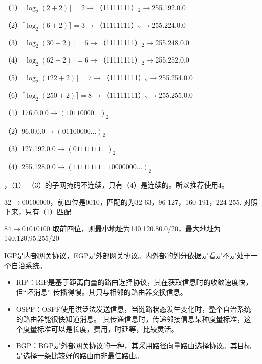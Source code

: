 \documentclass{ctexart}
\begin{document}
    （1）$\lceil\log_2(2+2) \rceil=2$$\rightarrow$（11111111）$_2\rightarrow$255.192.0.0

    （2）$\lceil\log_2(6+2) \rceil=3$$\rightarrow$（11111111）$_2\rightarrow$255.224.0.0

    （3）$\lceil\log_2(30+2) \rceil=5$$\rightarrow$（11111111）$_2\rightarrow$255.248.0.0

    （4）$\lceil\log_2(62+2) \rceil=6$$\rightarrow$（11111111）$_2\rightarrow$255.252.0.0

    （5）$\lceil\log_2(122+2) \rceil=7$$\rightarrow$（11111111）$_2\rightarrow$255.254.0.0

    （6）$\lceil\log_2(250+2) \rceil=8$$\rightarrow$（11111111）$_2\rightarrow$255.255.0.0


    \answer[4-25]
    （1）176.0.0.0$\rightarrow (10110000...)_2$

    \quad（2）96.0.0.0$\rightarrow (01100000...)_2$

    \quad（3）127.192.0.0$\rightarrow (01111111...)_2$

    \quad（4）255.128.0.0$\rightarrow (11111111\quad 10000000...)_2$

    ，（1）-（3）的子网掩码不连续，只有（4）是连续的。所以推荐使用4。
    
    \answer[4-31]
    $32\rightarrow 00100000$，前四位是0010，匹配的为32-63，96-127，160-191，224-255.
    对照下来，只有（1）匹配

    \answer[4-35]
    $84\rightarrow 01010100$ 取前四位，则最小地址为140.120.80.0/20，最大地址为140.120.95.255/20

    \answer[4-38]
    IGP是内部网关协议，EGP是外部网关协议。内外部的划分依据是看是不是处于一个自治系统。

    \answer[4-39]
    \begin{itemize}
        \item RIP：RIP是基于距离向量的路由选择协议，其在获取信息时的收敛速度快，但“坏消息”
        传播得慢。其只与相邻的路由器交换信息。
        \item OSPF：OSPF使用洪泛法发送信息，当链路状态发生变化时，整个自治系统的路由器能很快知道消息。
        其传递信息时，传递邻接信息某种度量标准，这个度量标准可以是长度，费用，时延等，比较灵活。
        \item BGP：BGP是外部网关协议的一种，其采用路径向量路由选择协议。其目标是选择一条比较好的路由而非最佳路由。
    \end{itemize}
\end{document}
